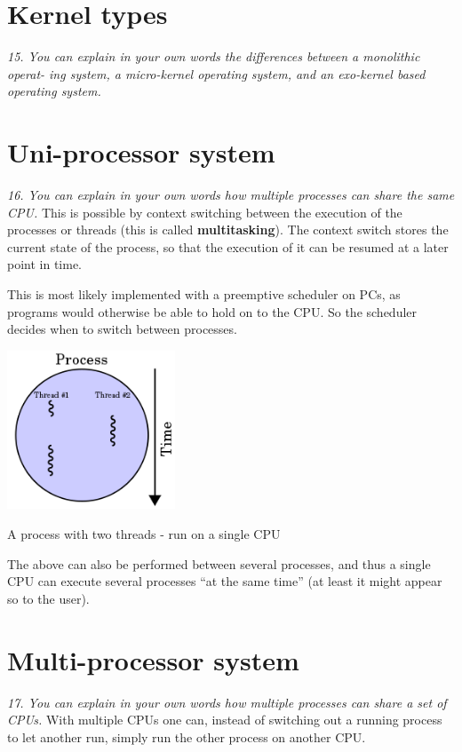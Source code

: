\documentclass{article}
\begin{document}
\section{Kernel types}
\emph{15. You can explain in your own words the differences between a monolithic operat-
ing system, a micro-kernel operating system, and an exo-kernel based operating
system.}



\section{Uni-processor system}
\emph{16. You can explain in your own words how multiple processes can share the same CPU.}
This is possible by context switching between the execution of the processes or threads (this is called \textbf{multitasking}). The context switch stores the current state of the process, so that the execution of it can be resumed at a later point in time.

This is most likely implemented with a preemptive scheduler on PCs, as programs would otherwise be able to hold on to the CPU. So the scheduler decides when to switch between processes.

\begin{center}
\includegraphics[width=5.0cm]{images/220px-Multithreaded_process.png}

A process with two threads - run on a single CPU
\end{center}

The above can also be performed between several processes, and thus a single CPU can execute several processes ``at the same time'' (at least it might appear so to the user).


\section{Multi-processor system}
\emph{17. You can explain in your own words how multiple processes can share a set of CPUs.}
With multiple CPUs one can, instead of switching out a running process to let another run, simply run the other process on another CPU.
\end{document}
